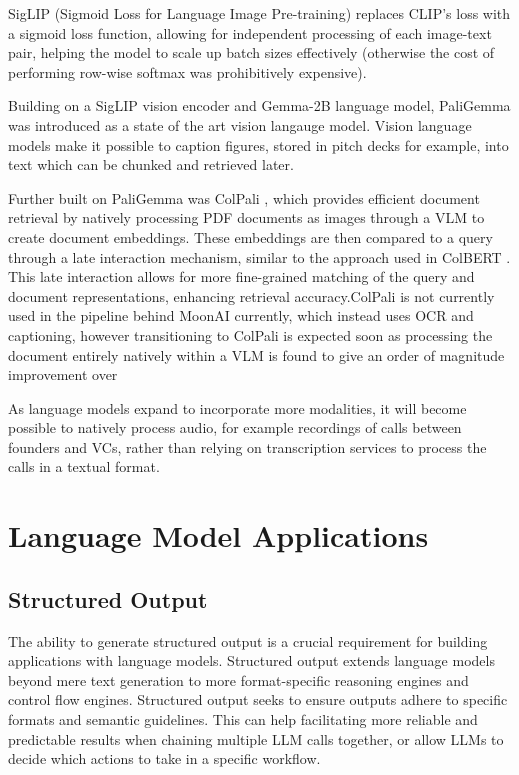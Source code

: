\documentclass[a4paper, oneside]{discothesis}
\begin{document}
SigLIP (Sigmoid Loss for Language Image Pre-training) \cite{zhai2023sigmoidlosslanguageimage} replaces CLIP's loss with a sigmoid loss function, allowing for independent processing of each image-text pair, helping the model to scale up batch sizes effectively (otherwise the cost of performing row-wise softmax was prohibitively expensive). 

Building on a SigLIP vision encoder and Gemma-2B language model, PaliGemma was introduced as a state of the art vision langauge model. \cite{gemma2024pali} 
Vision language models make it possible to caption figures, stored in pitch decks for example, into text which can be chunked and retrieved later.

Further built on PaliGemma was ColPali \cite{faysse_sibille_2024colpali}, which provides efficient document retrieval by natively processing PDF documents as images through a VLM to create document embeddings. These embeddings are then compared to a query through a late interaction mechanism, similar to the approach used in ColBERT \cite{khattab2020colbert}. This late interaction allows for more fine-grained matching of the query and document representations, enhancing retrieval accuracy.ColPali is not currently used in the pipeline behind MoonAI currently, which instead uses OCR and captioning, however transitioning to ColPali is expected soon as processing the document entirely natively within a VLM is found to give an order of magnitude improvement over 

As language models expand to incorporate more modalities, it will become possible to natively process audio, for example recordings of calls between founders and VCs, rather than relying on transcription services to process the calls in a textual format. 

\section{Language Model Applications}

\subsection{Structured Output}
The ability to generate structured output is a crucial requirement for building applications with language models. Structured output extends language models beyond mere text generation to more format-specific reasoning engines and control flow engines. Structured output seeks to ensure outputs adhere to specific formats and semantic guidelines. This can help facilitating more reliable and predictable results when chaining multiple LLM calls together,  or allow LLMs to decide which actions to take in a specific workflow.
\end{document}
